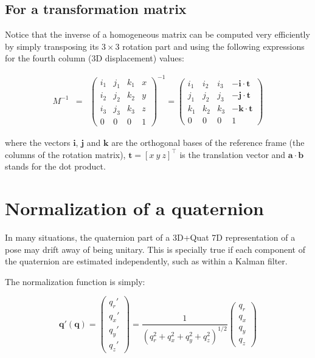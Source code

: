 \documentclass[a4paper,10pt]{report}
\begin{document}
\section{For a transformation matrix}
\label{sect:inverse:mat}

Notice that the inverse of a homogeneous matrix can be computed very efficiently by 
simply transposing its $3 \times 3$ rotation part and using the following expressions for the 
fourth column (3D displacement) values:

\begin{eqnarray}
M^{-1} &=& 
\left(
  \begin{array}{ccc|c}
   i_1 & j_1 & k_1 & x \\
   i_2 & j_2 & k_2 & y \\
   i_3 & j_3 & k_3 & z \\
   0 & 0 & 0 & 1
  \end{array}
\right) ^{-1} 
= 
\left(
  \begin{array}{ccc|c}
   i_1 & i_2 & i_3   & -\mathbf{i} \cdot \mathbf{t} \\ 
   j_1 & j_2 & j_3   & -\mathbf{j} \cdot \mathbf{t} \\ 
   k_1 & k_2 & k_3   & -\mathbf{k} \cdot \mathbf{t} \\ 
   0 & 0 & 0 & 1
  \end{array}
\right)
\end{eqnarray}

\noindent where the vectors $\mathbf{i}$, $\mathbf{j}$
and $\mathbf{k}$ are the orthogonal bases of the reference frame 
(the columns of the rotation matrix), 
$\mathbf{t}=[x ~ y ~ z]^\top$ is the translation vector and $\mathbf{a} \cdot \mathbf{b}$
stands for the dot product.


\chapter{Normalization of a quaternion}
\label{sect:quat:norm}

In many situations, the quaternion part of a 3D+Quat 7D representation 
of a pose may drift away of being unitary. 
This is specially true if each component of the quaternion are estimated 
independently, such as within a Kalman filter. 

The normalization function is simply:

\begin{equation}
\mathbf{q'}(\mathbf{q}) = 
\left(
\begin{array}{c}
 q_r' \\ q_x'\\ q_y'\\ q_z'
\end{array}
\right)
= 
\frac{1}{(q_r^2+q_x^2+q_y^2+q_z^2)^{1/2}}
\left(
\begin{array}{c}
 q_r \\ q_x\\ q_y\\ q_z
\end{array}
\right)
\end{equation}
\end{document}
